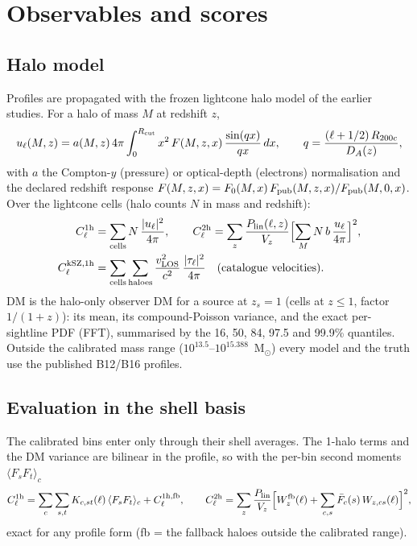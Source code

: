 \documentclass[10pt,a4paper]{article}
\newcommand{\Rc}{R_{200c}}
\newcommand{\Rcut}{R_{\rm cut}}
\begin{document}
\section{Observables and scores}\label{sec:obs}

\subsection{Halo model}
Profiles are propagated with the frozen lightcone halo model of the earlier studies. For a halo of mass $M$ at redshift $z$,
\begin{equation}
u_\ell(M,z)=a(M,z)\,4\pi\int_0^{\Rcut}x^2\,F(M,z,x)\,\frac{\sin(qx)}{qx}\,dx,\qquad q=\frac{(\ell+1/2)\,\Rc}{D_A(z)},
\end{equation}
with $a$ the Compton-$y$ (pressure) or optical-depth (electrons) normalisation and the declared redshift response
$F(M,z,x)=F_0(M,x)\,F_{\rm pub}(M,z,x)/F_{\rm pub}(M,0,x)$. Over the lightcone cells (halo counts $N$ in mass and redshift):
\begin{align}
C_\ell^{\rm 1h}&=\sum_{\rm cells}N\,\frac{|u_\ell|^2}{4\pi},\qquad
C_\ell^{\rm 2h}=\sum_z\frac{P_{\rm lin}(\ell,z)}{V_z}\Bigl[\sum_M N\,b\,\frac{u_\ell}{4\pi}\Bigr]^2,\\
C_\ell^{\rm kSZ,1h}&=\sum_{\rm cells}\sum_{\rm haloes}\frac{v_{\rm LOS}^2}{c^2}\,\frac{|\tau_\ell|^2}{4\pi}\quad(\text{catalogue velocities}).
\end{align}
DM is the halo-only observer DM for a source at $z_s=1$ (cells at $z\le1$, factor $1/(1+z)$): its mean, its compound-Poisson
variance, and the exact per-sightline PDF (FFT), summarised by the 16, 50, 84, 97.5 and 99.9\% quantiles. Outside the
calibrated mass range ($10^{13.5}$--$10^{15.388}$~M$_\odot$) every model and the truth use the published B12/B16 profiles.

\subsection{Evaluation in the shell basis}
The calibrated bins enter only through their shell averages. The 1-halo terms and the DM variance are bilinear in the
profile, so with the per-bin second moments $\langle F_sF_t\rangle_c$
\begin{equation}
C_\ell^{\rm 1h}=\sum_c\sum_{s,t}K_{c,st}(\ell)\,\langle F_sF_t\rangle_c+C_\ell^{\rm 1h,fb},\qquad
C_\ell^{\rm 2h}=\sum_z\frac{P_{\rm lin}}{V_z}\Bigl[W^{\rm fb}_z(\ell)+\sum_{c,s}\bar F_{c}(s)\,W_{z,cs}(\ell)\Bigr]^2,
\end{equation}
exact for any profile form (fb = the fallback haloes outside the calibrated range).
\end{document}
